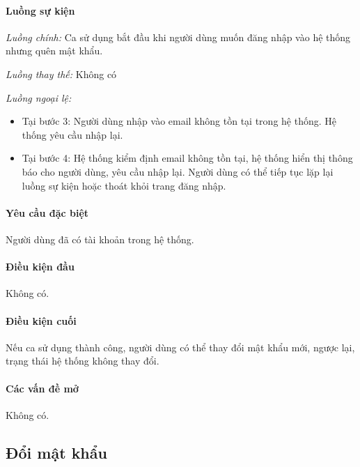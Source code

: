 \documentclass[./../main.tex]{subfiles}
\begin{document}
\paragraph*{Luồng sự kiện}

\emph{Luồng chính:} Ca sử dụng bắt đầu khi người dùng muốn đăng nhập vào
hệ thống nhưng quên mật khẩu.

\emph{Luồng thay thế:} Không có

\emph{Luồng ngoại lệ:}

\begin{itemize}
\item
  
  Tại bước 3: Người dùng nhập vào email không tồn tại trong hệ thống. Hệ
  thống yêu cầu nhập lại.
  
\item
  
  Tại bước 4: Hệ thống kiểm định email không tồn tại, hệ thống hiển thị
  thông báo cho người dùng, yêu cầu nhập lại. Người dùng có thể tiếp tục
  lặp lại luồng sự kiện hoặc thoát khỏi trang đăng nhập.
  
\end{itemize}

\paragraph*{Yêu cầu đặc biệt}

Người dùng đã có tài khoản trong hệ thống.

\paragraph*{Điều kiện đầu}

Không có.

\paragraph*{Điều kiện cuối}

Nếu ca sử dụng thành công, người dùng có thể thay đổi mật khẩu mới,
ngược lại, trạng thái hệ thống không thay đổi.

\paragraph*{Các vấn đề mở}

Không có.

\subsection{Đổi mật khẩu}
\end{document}
